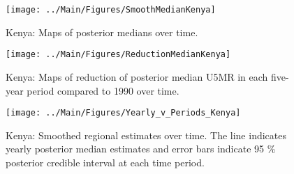 \documentclass[12pt]{article}\usepackage[]{graphicx}\usepackage[]{color}
\newenvironment{knitrout}{}{} %
\begin{document}
\begin{knitrout}
\color{fgcolor}\begin{figure}[bht]

{\centering \texttt{[image: ../Main/Figures/SmoothMedianKenya]} 

}

\caption[Kenya]{Kenya: Maps of posterior medians over time.}\label{fig:unnamed-chunk-164}
\end{figure}


\end{knitrout}
\begin{knitrout}
\color{fgcolor}\begin{figure}[bht]

{\centering \texttt{[image: ../Main/Figures/ReductionMedianKenya]} 

}

\caption[Kenya]{Kenya: Maps of reduction of posterior median U5MR in each five-year period compared to 1990 over time.}\label{fig:unnamed-chunk-165}
\end{figure}


\end{knitrout}
\begin{knitrout}
\color{fgcolor}\begin{figure}[bht]

{\centering \texttt{[image: ../Main/Figures/Yearly\_v\_Periods\_Kenya]} 

}

\caption[Kenya]{Kenya: Smoothed regional estimates over time. The line indicates yearly posterior median estimates and error bars indicate 95 \% posterior credible interval at each time period.}\label{fig:unnamed-chunk-166}
\end{figure}


\end{knitrout}
\end{document}
